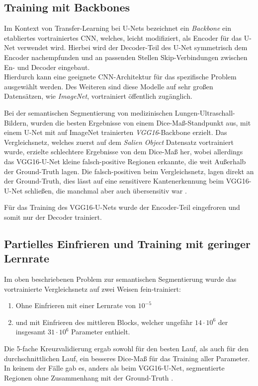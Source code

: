 \subsection{Training mit Backbones}

Im Kontext von Transfer-Learning bei U-Nets bezeichnet ein \textit{Backbone} ein etabliertes vortrainiertes \ac{CNN}, 
welches, leicht modifiziert, als Encoder für das U-Net verwendet wird. Hierbei wird der Decoder-Teil des U-Net 
symmetrisch dem Encoder nachempfunden und an passenden Stellen Skip-Verbindungen zwischen En- und Decoder eingebaut. \\
Hierdurch kann eine geeignete \ac{CNN}-Architektur für das spezifische Problem ausgewählt werden. Des Weiteren sind diese 
Modelle auf sehr großen Datensätzen, wie \textit{ImageNet}, vortrainiert öffentlich zugänglich. 

Bei der semantischen Segmentierung von medizinischen Lungen-Ultraschall-Bildern, wurden die besten Ergebnisse von einem Dice-Maß-Standpunkt aus, 
mit einem U-Net mit auf ImageNet trainierten \textit{VGG16}-Backbone erzielt. Das Vergleichsnetz, welches zuerst auf dem \textit{Salien Object}
Datensatz vortrainiert wurde, erzielte schlechtere Ergebnisse von dem Dice-Maß her, wobei allerdings das VGG16-U-Net kleine falsch-positive 
Regionen erkannte, die weit Außerhalb der Ground-Truth lagen. Die falsch-positiven beim Vergleichsnetz, lagen direkt an der Ground-Truth, 
dies lässt auf eine sensitivere Kantenerkennung beim VGG16-U-Net schließen, die manchmal aber auch übersensitiv war \cite{Cheng.05.10.2021}. 

Für das Training des VGG16-U-Nets wurde der Encoder-Teil eingefroren und somit nur der Decoder trainiert. 

\subsection{Partielles Einfrieren und Training mit geringer Lernrate}

Im oben beschriebenen Problem zur semantischen Segmentierung wurde das vortrainierte Vergleichsnetz auf zwei Weisen fein-trainiert:
\begin{enumerate}
	\item Ohne Einfrieren mit einer Lernrate von $10^{-5}$
	\item und mit Einfrieren des mittleren Blocks, welcher ungefähr $14\cdot 10^6$ der insgesamt $31 \cdot 10^6$ Parameter enthielt. 
\end{enumerate}
Die 5-fache Kreuzvalidierung ergab sowohl für den besten Lauf, als auch für den durchschnittlichen Lauf, ein besseres Dice-Maß 
für das Training aller Parameter. In keinem der Fälle gab es, anders als beim VGG16-U-Net, segmentierte Regionen ohne Zusammenhang mit der Ground-Truth \cite{Cheng.05.10.2021}. 

